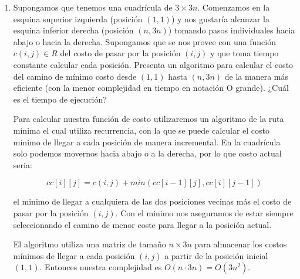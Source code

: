 \documentclass[12pt]{exam}
\begin{document}
\begin{enumerate}
\begin{enumerate}[label=b.]
\item Supongamos que tenemos una cuadr\'icula de $3 \times 3n$. Comenzamos en la esquina superior izquierda (posici\'on $(1,1)$) y nos gustar\'ia alcanzar la esquina inferior derecha (posici\'on $(n, 3n)$) tomando pasos individuales hacia abajo o hacia la derecha. Supongamos que se nos provee con una funci\'on $c(i, j) \in R$ del costo de pasar por la posici\'on $(i, j)$ y que toma tiempo constante calcular cada posici\'on. Presenta un algoritmo para calcular el costo del camino de m\'inimo costo desde $(1, 1)$ hasta $(n, 3n)$ de la manera m\'as eficiente (con la menor complejidad en tiempo en notaci\'on O grande). \mbox{¿}Cu\'al es el tiempo de ejecuci\'on?

\justify
Para calcular nuestra funci\'on de costo utilizaremos un algoritmo de la ruta m\'inima el cual utiliza recurrencia, con la que se puede calcular el costo mínimo de llegar a cada posición de manera incremental. En la cuadr\'icula solo podemos movernos hacia abajo o a la derecha, por lo que costo actual seria:

\begin{equation}
    cc[i][j] = c(i, j) + min(cc[i-1][j], cc[i][j-1])
\end{equation}

\justify
el m\´inimo de llegar a cualquiera de las dos posiciones vecinas m\'as el costo de pasar por la posici\'on $(i,j)$. Con el minimo nos aseguramos de estar siempre seleccionando el camino de menor coste para llegar a la posición actual.

\justify
El algoritmo utiliza una matriz de tama\mbox{ñ}o $n \times 3n$ para almacenar los costos mínimos de llegar a cada posición $(i, j)$ a partir de la posición inicial $(1, 1)$. Entonces nuestra complejidad es $O(n\cdot 3n) = O(3n^2)$.

\end{enumerate}


\end{enumerate}
\end{document}
